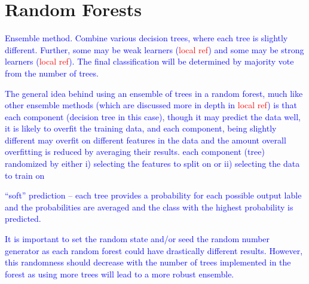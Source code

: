 \section{Random Forests}

\textcolor{blue}{Ensemble method. Combine various decision trees, where each tree is slightly different. Further, some may be weak learners (\textcolor{red}{local ref}) and some may be strong learners (\textcolor{red}{local ref}). The final classification will be determined by majority vote from the number of trees.}

\textcolor{blue}{The general idea behind using an ensemble of trees in a random forest, much like other ensemble methods (which are discussed more in depth in \textcolor{red}{local ref}) is that each component (decision tree in this case), though it may predict the data well, it is likely to overfit the training data, and each component, being slightly different may overfit on different features in the data and the amount overall overfitting is reduced by averaging their results.  each component (tree) randomized by either i) selecting the features to split on or ii) selecting the data to train on}

\textcolor{blue}{``soft'' prediction -- each tree provides a probability for each possible output lable and the probabilities are averaged and the class with the highest probability is predicted.}

\textcolor{blue}{It is important to set the random state and/or seed the random number generator as each random forest could have drastically different results. However, this randomness should decrease with the number of trees implemented in the forest as using more trees will lead to a more robust ensemble.}



